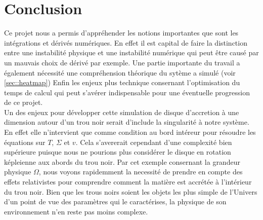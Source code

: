 \section*{Conclusion}


Ce projet nous a permis d'appréhender les notions importantes que sont les intégrations et dérivés numériques. En effet il est capital de faire la distinction entre une instabilité physique et une instabilité numérique qui peut être causé par un mauvais choix de dérivé par exemple. Une partie importante du travail a également nécessité une compréhension théorique du sytème a simulé (voir \ref{sec::heatmap}) Enfin les enjeux plus technique consernant l'optimisation du temps de calcul qui peut s'avérer indispensable pour une éventuelle progression de ce projet.\\


Un des enjeux pour développer cette simulation de disque d'accretion à une dimension autour d'un trou noir serait d'include la singularité à notre système. En effet elle n'intervient que comme condition au bord intéreur pour résoudre les équations sur $T$, $\Sigma$ et $v$. Cela s'avererait cependant d'une complexité bien supérieure puisque nous ne pourions plus considérer le disque en rotation képleienne aux abords du trou noir. Par cet exemple consernant la grandeur physique $\Omega$, nous voyons rapidemment la necessité de prendre en compte des effets relativistes pour comprendre comment la matière est accrétée à l'intérieur du trou noir. Bien que les trous noirs soient les objets les plus simple de l'Univers d'un point de vue des paramètres qui le caractérises, la physique de son environnement n'en reste pas moins complexe. 